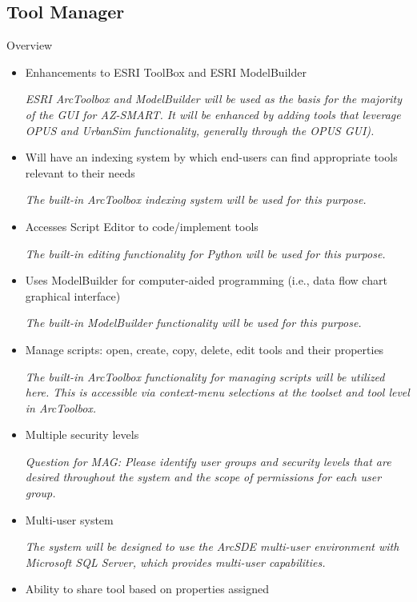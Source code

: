 \documentclass[titlepage]{article}
\begin{document}
\subsection{Tool Manager}
Overview
\begin{itemize}

\item Enhancements to ESRI ToolBox and ESRI ModelBuilder

\emph{ESRI ArcToolbox and ModelBuilder will be used as the basis for the majority of the GUI for AZ-SMART.  It will be enhanced by adding tools that leverage OPUS and UrbanSim functionality, generally through the OPUS GUI).}

\item Will have an indexing system by which end-users can find appropriate tools relevant to their needs

\emph{The built-in ArcToolbox indexing system will be used for this purpose.}

\item Accesses Script Editor to code/implement tools

\emph{The built-in editing functionality for Python will be used for this purpose.}

\item Uses ModelBuilder for computer-aided programming (i.e., data flow chart graphical interface)

\emph{The built-in ModelBuilder functionality will be used for this purpose.}

\item Manage scripts: open, create, copy, delete, edit tools and their properties

\emph{The built-in ArcToolbox functionality for managing scripts will be utilized here.  This is accessible via context-menu selections at the toolset and tool level in ArcToolbox.}

\item Multiple security levels

\emph{Question for MAG: Please identify user groups and security levels that are desired throughout the system and the scope of permissions for each user group.}

\item Multi-user system

\emph{The system will be designed to use the ArcSDE multi-user environment with Microsoft SQL Server, which provides multi-user capabilities.}

\item Ability to share tool based on properties assigned


\end{itemize}
\end{document}
